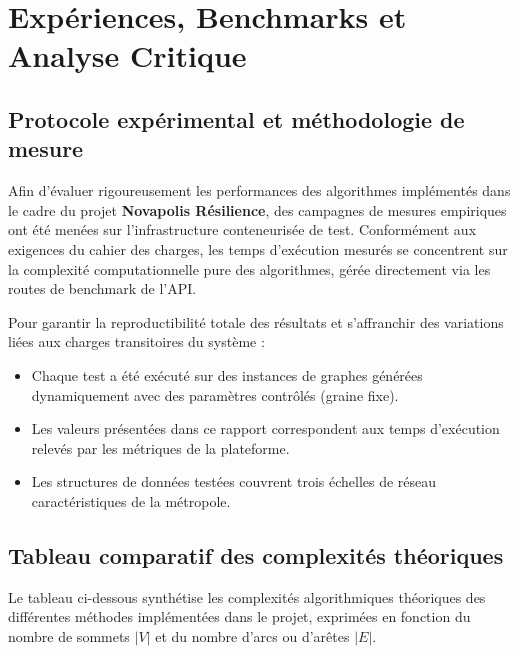 \section{Expériences, Benchmarks et Analyse Critique}

\subsection{Protocole expérimental et méthodologie de mesure}
Afin d'évaluer rigoureusement les performances des algorithmes implémentés dans le cadre du projet \textbf{Novapolis Résilience}, des campagnes de mesures empiriques ont été menées sur l'infrastructure conteneurisée de test. Conformément aux exigences du cahier des charges, les temps d'exécution mesurés se concentrent sur la complexité computationnelle pure des algorithmes, gérée directement via les routes de benchmark de l'API.

Pour garantir la reproductibilité totale des résultats et s'affranchir des variations liées aux charges transitoires du système :
\begin{itemize}
    \item Chaque test a été exécuté sur des instances de graphes générées dynamiquement avec des paramètres contrôlés (graine fixe).
    \item Les valeurs présentées dans ce rapport correspondent aux temps d'exécution relevés par les métriques de la plateforme.
    \item Les structures de données testées couvrent trois échelles de réseau caractéristiques de la métropole.
\end{itemize}

\subsection{Tableau comparatif des complexités théoriques}
Le tableau ci-dessous synthétise les complexités algorithmiques théoriques des différentes méthodes implémentées dans le projet, exprimées en fonction du nombre de sommets $|V|$ et du nombre d'arcs ou d'arêtes $|E|$.

